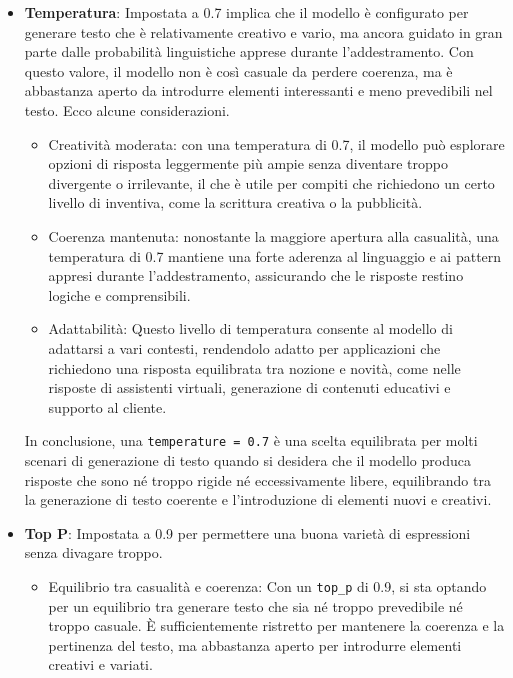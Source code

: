         \begin{itemize}
            \item
                \textbf{Temperatura}: Impostata a 0.7 implica che il modello è configurato per generare testo che è relativamente creativo e vario, ma ancora guidato in gran parte dalle probabilità linguistiche apprese durante l'addestramento. Con questo valore, il modello non è così casuale da perdere coerenza, ma è abbastanza aperto da introdurre elementi interessanti e meno prevedibili nel testo. Ecco alcune considerazioni.
                \begin{itemize}
                    \item Creatività moderata: con una temperatura di 0.7, il modello può esplorare opzioni di risposta leggermente più ampie senza diventare troppo divergente o irrilevante, il che è utile per compiti che richiedono un certo livello di inventiva, come la scrittura creativa o la pubblicità.

                    \item Coerenza mantenuta: nonostante la maggiore apertura alla casualità, una temperatura di 0.7 mantiene una forte aderenza al linguaggio e ai pattern appresi durante l'addestramento, assicurando che le risposte restino logiche e comprensibili.
                
                    \item Adattabilità: Questo livello di temperatura consente al modello di adattarsi a vari contesti, rendendolo adatto per applicazioni che richiedono una risposta equilibrata tra nozione e novità, come nelle risposte di assistenti virtuali, generazione di contenuti educativi e supporto al cliente.
                \end{itemize}
                
                In conclusione, una \texttt{temperature = 0.7} è una scelta equilibrata per molti scenari di generazione di testo quando si desidera che il modello produca risposte che sono né troppo rigide né eccessivamente libere, equilibrando tra la generazione di testo coerente e l'introduzione di elementi nuovi e creativi.

        \item
            \textbf{Top P}: Impostata a 0.9 per permettere una buona varietà di espressioni senza divagare troppo.

            \begin{itemize}
                \item Equilibrio tra casualità e coerenza: Con un \texttt{top\_p} di 0.9, si sta optando per un equilibrio tra generare testo che sia né troppo prevedibile né troppo casuale. È sufficientemente ristretto per mantenere la coerenza e la pertinenza del testo, ma abbastanza aperto per introdurre elementi creativi e variati.
        

\end{itemize}
\end{itemize}

